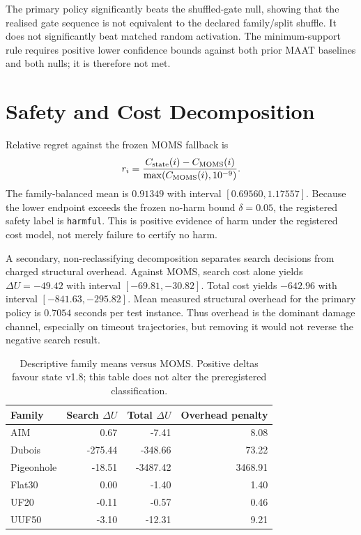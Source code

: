 \documentclass[11pt,a4paper]{article}
\newcommand{\MOMS}{\mathrm{MOMS}}
\begin{document}
The primary policy significantly beats the shuffled-gate null, showing that
the realised gate sequence is not equivalent to the declared family/split
shuffle.  It does not significantly beat matched random activation.  The
minimum-support rule requires positive lower confidence bounds against both
prior MAAT baselines and both nulls; it is therefore not met.

\section{Safety and Cost Decomposition}

Relative regret against the frozen MOMS fallback is
\begin{equation}
r_i=\frac{C_{\rm state}(i)-C_{\MOMS}(i)}{\max(C_{\MOMS}(i),10^{-9})}.
\end{equation}
The family-balanced mean is $0.91349$ with interval
$[0.69560,1.17557]$.  Because the lower endpoint exceeds the frozen no-harm
bound $\delta=0.05$, the registered safety label is
\texttt{harmful}.  This is positive evidence of harm under the registered cost
model, not merely failure to certify no harm.

A secondary, non-reclassifying decomposition separates search decisions from
charged structural overhead.  Against MOMS, search cost alone yields
$\Delta U=-49.42$ with interval $[-69.81,-30.82]$.  Total cost yields
$-642.96$ with interval $[-841.63,-295.82]$.  Mean measured structural overhead
for the primary policy is $0.7054$ seconds per test instance.  Thus overhead is
the dominant damage channel, especially on timeout trajectories, but removing
it would not reverse the negative search result.

\begin{table}[H]
\centering
\caption{Descriptive family means versus MOMS.  Positive deltas favour state
v1.8; this table does not alter the preregistered classification.}
\small
\begin{tabular}{lrrr}
\toprule
Family & Search $\Delta U$ & Total $\Delta U$ & Overhead penalty\\
\midrule
AIM & 0.67 & -7.41 & 8.08\\
Dubois & -275.44 & -348.66 & 73.22\\
Pigeonhole & -18.51 & -3487.42 & 3468.91\\
Flat30 & 0.00 & -1.40 & 1.40\\
UF20 & -0.11 & -0.57 & 0.46\\
UUF50 & -3.10 & -12.31 & 9.21\\
\bottomrule
\end{tabular}
\end{table}
\end{document}
